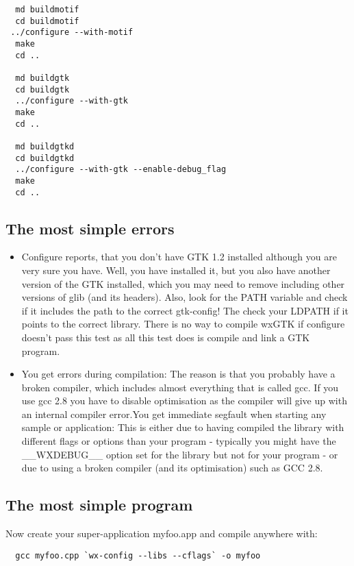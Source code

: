 \begin{verbatim}
  md buildmotif
  cd buildmotif
 ../configure --with-motif
  make
  cd ..

  md buildgtk
  cd buildgtk
  ../configure --with-gtk
  make
  cd ..

  md buildgtkd
  cd buildgtkd
  ../configure --with-gtk --enable-debug_flag
  make
  cd ..
\end{verbatim}

\subsection{The most simple errors}

\begin{itemize}\itemsep=0pt
\item Configure reports, that you don't have GTK 1.2 installed although you are 
very sure you have. Well, you have installed it, but you also have another 
version of the GTK installed, which you may need to remove including other 
versions of glib (and its headers). Also, look for the PATH variable and check 
if it includes the path to the correct gtk-config! The check your LDPATH if it 
points to the correct library. There is no way to compile wxGTK if configure 
doesn't pass this test as all this test does is compile and link a GTK program.
\item You get errors during compilation: The reason is that you probably have a broken 
compiler, which includes almost everything that is called gcc. If you use gcc 2.8 
you have to disable optimisation as the compiler will give up with an internal 
compiler error.You get immediate segfault when starting any sample or application: This is either 
due to having compiled the library with different flags or options than your program - 
typically you might have the __WXDEBUG__ option set for the library but not for your 
program - or due to using a broken compiler (and its optimisation) such as GCC 2.8.
\end{itemize}

\subsection{The most simple program}

Now create your super-application myfoo.app and compile anywhere with:

\begin{verbatim}
  gcc myfoo.cpp `wx-config --libs --cflags` -o myfoo
\end{verbatim}

